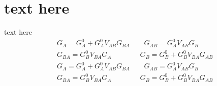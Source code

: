 \documentclass[handout,t]{beamer}
\begin{document}
\section{text here}
\begin{frame}{text here}
	\begin{equation}
		\begin{split}
			  & {{G}_{A}}=G_{A}^{0}+G_{A}^{0}{{V}_{AB}}{{G}_{BA}}\qquad {{G}_{AB}}=G_{A}^{0}{{V}_{AB}}{{G}_{B}} \\ 
			 & {{G}_{BA}}=G_{B}^{0}{{V}_{BA}}{{G}_{A}}\qquad \qquad {{G}_{B}}=G_{B}^{0}+G_{B}^{0}{{V}_{BA}}{{G}_{AB}} \\ 
			 & {{G}_{A}}=G_{A}^{0}+G_{A}^{0}{{V}_{AB}}{{G}_{BA}}\qquad {{G}_{AB}}=G_{A}^{0}{{V}_{AB}}{{G}_{B}} \\ 
			& {{G}_{BA}}=G_{B}^{0}{{V}_{BA}}{{G}_{A}}\qquad \qquad {{G}_{B}}=G_{B}^{0}+G_{B}^{0}{{V}_{BA}}{{G}_{AB}} \\ 
		\end{split}
		\label{eq:greenselfenergy}
	\end{equation}
\end{frame}
\end{document}
